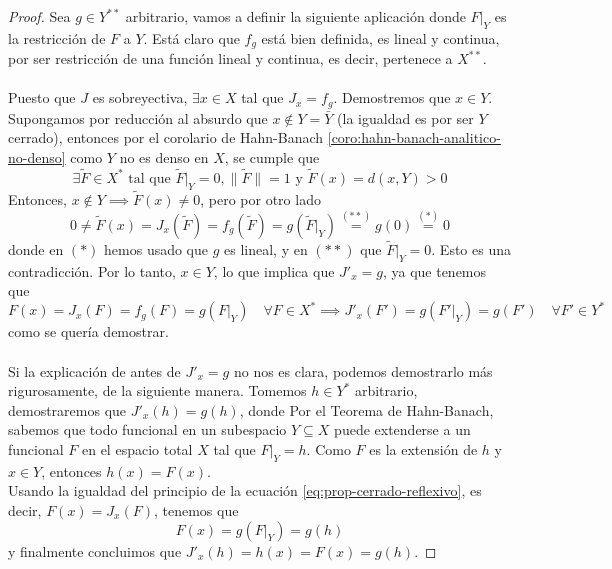 \begin{prop}
\begin{proof}
    \noindent
    Sea $g \in Y^{**}$ arbitrario, vamos a definir la siguiente aplicación
    donde $F|_Y$ es la restricción de $F$ a $Y$. Está claro que $f_g$ está bien definida, es lineal y continua, por ser restricción de una función lineal y continua, es decir, pertenece a $X^{**}$.\\ \\
    \noindent
    Puesto que $J$ es sobreyectiva, $\exists x \in X$ tal que $J_x = f_g$. Demostremos que $x \in Y$. Supongamos por reducción al absurdo que $x \notin Y=\bar{Y}$ (la igualdad es por ser $Y$ cerrado), entonces por el corolario de Hahn-Banach \ref{coro:hahn-banach-analitico-no-denso} como $Y$ no es denso en $X$, se cumple que
    \begin{equation*}
        \exists \tilde{F} \in X^* \text{ tal que } \tilde{F}|_Y = 0, \|\tilde{F}\| = 1 \text{ y } \tilde{F}(x) = d(x, Y) > 0
    \end{equation*}
    Entonces, $x \notin Y \implies \tilde{F}(x) \neq 0$, pero por otro lado
    $$0 \neq \tilde{F}(x) = J_x(\tilde{F}) = f_g(\tilde{F}) = g(\tilde{F}|_Y) \overset{(**)}{=}g(0) \overset{(*)}{=} 0$$
    donde en $(*)$ hemos usado que $g$ es lineal, y en $(**)$ que $\tilde{F}|_Y = 0$. Esto es una contradicción. Por lo tanto, $x \in Y$, lo que implica que $J'_x = g$, ya que tenemos que 
    \begin{equation*}\label{eq:prop-cerrado-reflexivo}
        F(x)=J_x(F) = f_g(F) = g(F|_Y) \quad \forall F \in X^* \implies J'_x(F') = g(F'|_Y)=g(F') \quad \forall F' \in Y^*
    \end{equation*}
    como se quería demostrar. \\ \\
    \noindent
    Si la explicación de antes de $J'_x=g$ no nos es clara, podemos demostrarlo más rigurosamente, de la siguiente manera. Tomemos $h\in Y^*$ arbitrario, demostraremos que $J'_x(h)=g(h)$, donde
    Por el Teorema de Hahn-Banach, sabemos que todo funcional en un subespacio $Y\subseteq X$ puede extenderse a un funcional $F$ en el espacio total $X$ tal que $F|_Y = h$. Como $F$ es la extensión de $h$ y $x \in Y$, entonces $h(x) = F(x)$. \\
    Usando la igualdad del principio de la ecuación \ref{eq:prop-cerrado-reflexivo}, es decir, $F(x)=J_x(F)$, tenemos que
    $$F(x) = g(F|_Y) = g(h)$$
    y finalmente concluimos que $J'_x(h) = h(x)=F(x)=g(h)$.
\end{proof}
\end{prop}

